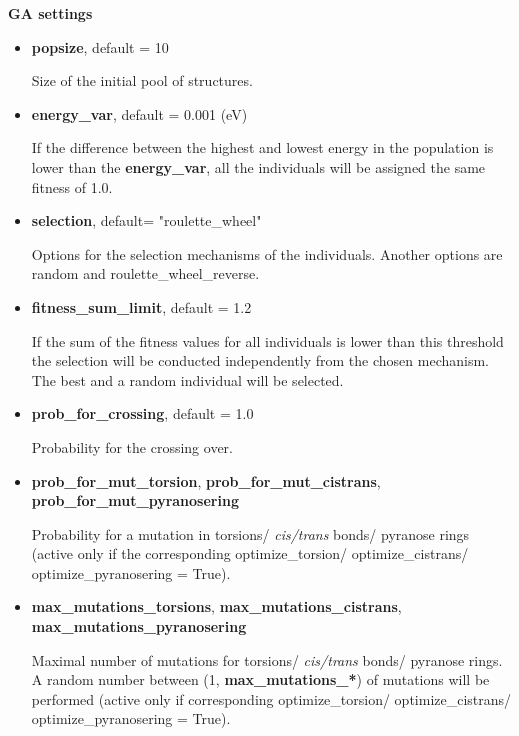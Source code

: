\documentclass[a4paper]{article}
\begin{document}
\noindent
\textbf{\large{GA settings}}

\begin{itemize}

	\item{\textbf{popsize}}, default = 10
	
Size of the initial pool of structures.     
	

	\item{\textbf{energy\_var}}, default = 0.001 (eV)
	
If the difference between the highest and lowest energy in the population is lower than the \textbf{energy\_var}, all the individuals will be assigned the same fitness of 1.0. 
	
\item{\textbf{selection}}, default= "roulette\_wheel"
	
Options for the selection mechanisms of the individuals. Another options are random and roulette\_wheel\_reverse.

\item{\textbf{fitness\_sum\_limit}}, default = 1.2

If the sum of the fitness values for all individuals is lower than this threshold the selection will be conducted independently from the chosen mechanism. The best and a random individual will be selected. 

	\item{\textbf{prob\_for\_crossing}}, default = 1.0

Probability for the crossing over.

	\item{\textbf{prob\_for\_mut\_torsion},  \textbf{prob\_for\_mut\_cistrans},\\	\textbf{prob\_for\_mut\_pyranosering}}

Probability for a mutation in torsions/ \textit{cis/trans} bonds/ pyranose rings (active only if the corresponding optimize\_torsion/ optimize\_cistrans/  optimize\_pyranosering  = True).


	\item{\textbf{max\_mutations\_torsions}, \textbf{max\_mutations\_cistrans}, \\
	\textbf{max\_mutations\_pyranosering}}

Maximal number of mutations for torsions/ \textit{cis/trans} bonds/ pyranose rings. A random number between (1, \textbf{max\_mutations\_*}) of mutations will be performed (active only if corresponding optimize\_torsion/ optimize\_cistrans/  optimize\_pyranosering  = True).


\end{itemize}
\end{document}
